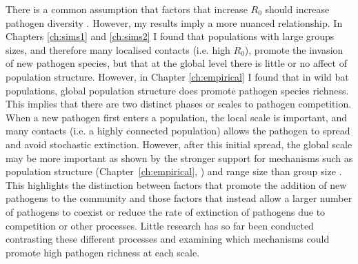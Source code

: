 



There is a common assumption that factors that increase $R_0$ should increase pathogen diversity \cite{nunn2003comparative, morand2000wormy}.
However, my results imply a more nuanced relationship. 
In Chapters \ref{ch:sims1} and \ref{ch:sims2} I found that populations with large groups sizes, and therefore many localised contacts (i.e. high $R_0$), promote the invasion of new pathogen species, but that at the global level there is little or no affect of population structure.
However, in Chapter \ref{ch:empirical} I found that in wild bat populations, global population structure does promote pathogen species richness.
This implies that there are two distinct phases or scales to pathogen competition.
When a new pathogen first enters a population, the local scale is important, and many contacts (i.e. a highly connected population) allows the pathogen to spread and avoid stochastic extinction.
However, after this initial spread, the global scale may be more important as  shown by the stronger support for mechanisms such as population structure (Chapter~\ref{ch:empirical}, \textcite{turmelle2009correlates, maganga2014bat}) and range size \cite{kamiya2014determines, nunn2003comparative} than group size \cite{rifkin2012animals, ezenwa2006host}.
This highlights the distinction between factors that promote the addition of new pathogens to the community and those factors that instead allow a larger number of pathogens to coexist or reduce the rate of extinction of pathogens due to competition or other processes.
Little research has so far been conducted contrasting these different processes and examining which mechanisms could promote high pathogen richness at each scale.

